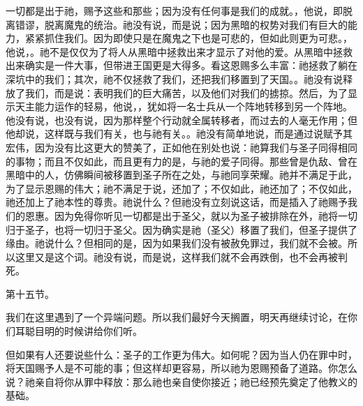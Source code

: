 一切都是出于祂，赐予这些和那些；因为没有任何事是我们的成就。，他说，即脱离错谬，脱离魔鬼的统治。祂没有说，而是说；因为黑暗的权势对我们有巨大的能力，紧紧抓住我们。因为即使只是在魔鬼之下也是可悲的，但如此则更为可悲。，他说，。祂不是仅仅为了将人从黑暗中拯救出来才显示了对他的爱。从黑暗中拯救出来确实是一件大事，但带进王国更是大得多。看这恩赐多么丰富：祂拯救了躺在深坑中的我们；其次，祂不仅拯救了我们，还把我们移置到了天国。。祂没有说释放了我们，而是说：表明我们的巨大痛苦，以及他们对我们的掳掠。然后，为了显示天主能力运作的轻易，他说，，犹如将一名士兵从一个阵地转移到另一个阵地。他没有说，也没有说，因为那样整个行动就全属转移者，而过去的人毫无作用；但他却说，这样既与我们有关，也与祂有关。。祂没有简单地说，而是通过说赋予其宏伟，因为没有比这更大的赞美了，正如他在别处也说：祂算我们与圣子同得相同的事物；而且不仅如此，而且更有力的是，与祂的爱子同得。那些曾是仇敌、曾在黑暗中的人，仿佛瞬间被移置到圣子所在之处，与祂同享荣耀。祂并不满足于此，为了显示恩赐的伟大；祂不满足于说，还加了；不仅如此，祂还加了；不仅如此，祂还加上了祂本性的尊贵。祂说什么？但祂没有立刻说这话，而是插入了祂赐予我们的恩惠。因为免得你听见一切都是出于圣父，就以为圣子被排除在外，祂将一切归于圣子，也将一切归于圣父。因为确实是祂（圣父）移置了我们，但圣子提供了缘由。祂说什么？但相同的是，因为如果我们没有被赦免罪过，我们就不会被。所以这里又是这个词。祂没有说，而是说，这样我们就不会再跌倒，也不会再被判死。\par

第十五节。\par

我们在这里遇到了一个异端问题。所以我们最好今天搁置，明天再继续讨论，在你们耳聪目明的时候讲给你们听。\par

但如果有人还要说些什么：圣子的工作更为伟大。如何呢？因为当人仍在罪中时，将天国赐予人是不可能的事；但这样却更容易，所以祂为恩赐预备了道路。你怎么说？祂亲自将你从罪中释放：那么祂也亲自使你接近；祂已经预先奠定了他教义的基础。\par

